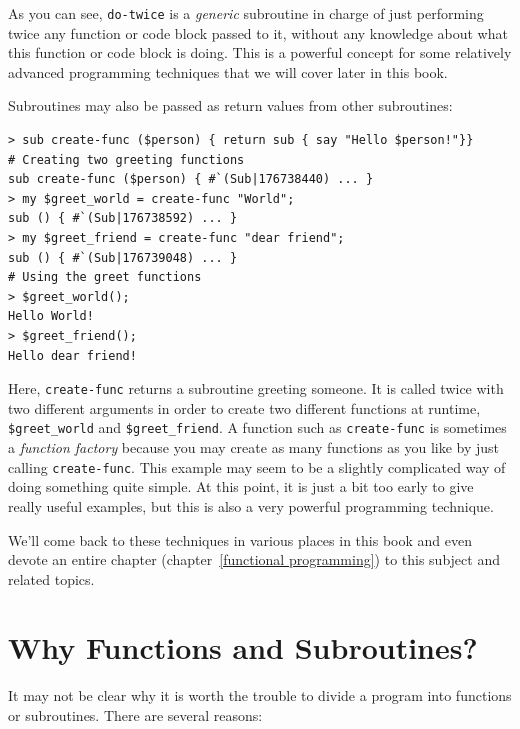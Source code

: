As you can see, \verb"do-twice" is a \emph{generic} subroutine in 
charge of just performing twice any function or code 
block passed to it, without any knowledge about what 
this function or code block is doing. This is a powerful 
concept for some relatively advanced programming techniques 
that we will cover later in this book.

Subroutines may also be passed as return values from other 
subroutines:

\begin{verbatim}
> sub create-func ($person) { return sub { say "Hello $person!"}}
# Creating two greeting functions
sub create-func ($person) { #`(Sub|176738440) ... }
> my $greet_world = create-func "World";
sub () { #`(Sub|176738592) ... }
> my $greet_friend = create-func "dear friend";
sub () { #`(Sub|176739048) ... }
# Using the greet functions
> $greet_world();
Hello World!
> $greet_friend();
Hello dear friend!
\end{verbatim} 

Here, \verb"create-func" returns a subroutine greeting someone. 
It is called twice with two different arguments in order to 
create two different functions at runtime, \verb"$greet_world" and 
\verb"$greet_friend". A function such as \verb"create-func" 
is sometimes a \emph{function factory} because you may create as many 
functions as you like by just calling \verb"create-func". This 
example may seem to be a slightly complicated way of doing 
something quite simple. At this point, it is 
just a bit too early to give really useful examples, but 
this is also a very powerful programming technique.  

We'll come back to these techniques in various places in this 
book and even devote an entire chapter (chapter~\ref{functional 
programming}) to this subject and related topics.


\section{Why Functions and Subroutines?}

It may not be clear why it is worth the trouble to divide
a program into functions or subroutines.  There are 
several reasons:

